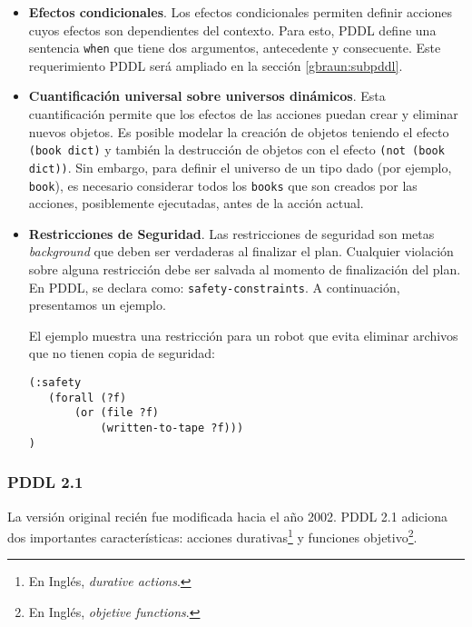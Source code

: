 	\begin{itemize}
	
	\item {\bf Efectos condicionales}. Los efectos condicionales permiten 
	definir acciones cuyos efectos son dependientes
	del contexto. Para esto, PDDL define una sentencia \texttt{when} que
	tiene dos argumentos, antecedente y consecuente. Este requerimiento
	PDDL ser\'a ampliado en la secci\'on \ref{gbraun:subpddl}.

	\item {\bf Cuantificaci\'on universal sobre universos din\'amicos}. %
	Esta cuantificaci\'on permite que los efectos de las acciones puedan crear 
	y eliminar nuevos objetos. Es posible modelar la creaci\'on de objetos 
	teniendo el efecto \texttt{(book dict)} y tambi\'en 
	la destrucci\'on de objetos con el efecto \texttt{(not (book dict))}. 
	Sin embargo, para definir el universo
	de un tipo dado (por ejemplo, \texttt{book}), es necesario considerar
	todos los \texttt{books} que son creados por las acciones,
	posiblemente ejecutadas, antes de la acci\'on actual.
	
	\item {\bf Restricciones de Seguridad}. %
	Las restricciones de seguridad son metas \emph{background} que deben
	ser verdaderas al finalizar el plan. Cualquier violaci\'on sobre alguna restricci\'on
	debe ser salvada al momento de finalizaci\'on del plan. En PDDL, se declara 
	como: \texttt{safety-constraints}. A continuaci\'on, presentamos un ejemplo.
	
	\begin{ejemplo}
	
	El ejemplo muestra una restricci\'on para un robot que evita 
	eliminar archivos que no tienen copia de seguridad:
	
        \begin{verbatim}	
(:safety
   (forall (?f)
       (or (file ?f) 
           (written-to-tape ?f)))
)
        \end{verbatim} 	
	\end{ejemplo}
	\end{itemize}


\subsubsection{PDDL 2.1}

La versi\'on original reci\'en fue modificada hacia el a\~{n}o 2002.
PDDL 2.1 \cite{gbraun:pddl211} adiciona dos importantes caracter\'isticas: 
acciones durativas\footnote{En Ingl\'es, \emph{durative actions}.} y 
funciones objetivo\footnote{En Ingl\'es, \emph{objetive functions}.}.

